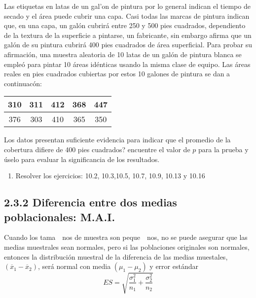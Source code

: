 \begin{frame}
\begin{frame}
\begin{Ejem}
Las etiquetas en latas de un gal'on de pintura por lo general indican el tiempo de secado y el \'area puede cubrir una capa. Casi todas las marcas de pintura indican que, en una capa, un gal\'on cubrir\'a entre 250 y 500 pies cuadrados, dependiento de la textura de la superficie a pintarse, un fabricante, sin embargo afirma que un gal\'on de su pintura cubrir\'a 400 pies cuadrados de \'area superficial. Para probar su afirmaci\'on, una muestra aleatoria de 10 latas de un gal\'on de pintura blanca se emple\'o para pintar 10 \'areas id\'enticas usando la misma clase de equipo. Las \'areas reales en pies cuadrados cubiertas por estos 10 galones de pintura se dan a continuac\'on:
\begin{center}
\begin{tabular}{|c|c|c|c|c|}
\hline 
310 & 311 & 412 & 368 & 447 \\ 
\hline 
376 & 303 &410 &365 & 350 \\ 
\hline 
\end{tabular} 
\end{center}
\end{Ejem}






\begin{Ejem}
Los datos presentan suficiente evidencia para indicar que el promedio de la cobertura difiere de 400 pies cuadrados? encuentre el valor de $p$ para la prueba y \'uselo para evaluar la significancia de los resultados.
\end{Ejem}
\begin{enumerate}
\item Resolver los ejercicios: 10.2, 10.3,10.5, 10.7, 10.9, 10.13 y 10.16
\end{enumerate}





\subsection{2.3.2 Diferencia entre dos medias poblacionales: M.A.I.}



\begin{Note}
Cuando los tama\ ~nos de muestra son peque\ ~nos, no se puede asegurar que las medias muestrales sean normales, pero si las poblaciones originales son normales, entonces la distribuci\'on muestral de la diferencia de las medias muestales, $\left(\overline{x}_{1}-\overline{x}_{2}\right)$, ser\'a normal con media $\left(\mu_{1}-\mu_{2}\right)$ y error est\'andar $$ES=\sqrt{\frac{\sigma_{1}^{2}}{n_{1}}+\frac{\sigma_{2}^{2}}{n_{2}}}$$


\end{Note}
\end{frame}
\end{frame}
